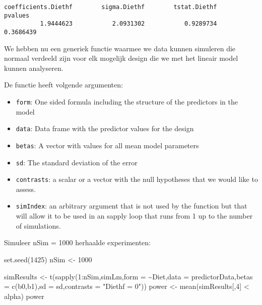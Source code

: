 \documentclass[
]{article}
\newenvironment{Shaded}{\begin{snugshade}}{\end{snugshade}}
\newcommand{\AttributeTok}[1]{\textcolor[rgb]{0.77,0.63,0.00}{#1}}
\newcommand{\DecValTok}[1]{\textcolor[rgb]{0.00,0.00,0.81}{#1}}
\newcommand{\FunctionTok}[1]{\textcolor[rgb]{0.00,0.00,0.00}{#1}}
\newcommand{\NormalTok}[1]{#1}
\newcommand{\OtherTok}[1]{\textcolor[rgb]{0.56,0.35,0.01}{#1}}
\newcommand{\SpecialCharTok}[1]{\textcolor[rgb]{0.00,0.00,0.00}{#1}}
\newcommand{\StringTok}[1]{\textcolor[rgb]{0.31,0.60,0.02}{#1}}
\providecommand{\tightlist}{%
  \setlength{\itemsep}{0pt}\setlength{\parskip}{0pt}}
\begin{document}
\begin{verbatim}
coefficients.Diethf        sigma.Diethf        tstat.Diethf             pvalues 
          1.9444623           2.0931302           0.9289734           0.3686439 
\end{verbatim}

We hebben nu een generiek functie waarmee we data kunnen simuleren die
normaal verdeeld zijn voor elk mogelijk design die we met het lineair
model kunnen analyseren.

De functie heeft volgende argumenten:

\begin{itemize}
\tightlist
\item
  \texttt{form}: One sided formula including the structure of the
  predictors in the model
\item
  \texttt{data}: Data frame with the predictor values for the design
\item
  \texttt{betas}: A vector with values for all mean model parameters
\item
  \texttt{sd}: The standard deviation of the error
\item
  \texttt{contrasts}: a scalar or a vector with the null hypotheses that
  we would like to assess.
\item
  \texttt{simIndex}: an arbitrary argument that is not used by the
  function but that will allow it to be used in an sapply loop that runs
  from 1 up to the number of simulations.
\end{itemize}

Simuleer nSim = 1000 herhaalde experimenten:

\begin{Shaded}
\begin{Highlighting}[]
\FunctionTok{set.seed}\NormalTok{(}\DecValTok{1425}\NormalTok{)}
\NormalTok{nSim }\OtherTok{\textless{}{-}} \DecValTok{1000}

\NormalTok{simResults  }\OtherTok{\textless{}{-}} \FunctionTok{t}\NormalTok{(}\FunctionTok{sapply}\NormalTok{(}\DecValTok{1}\SpecialCharTok{:}\NormalTok{nSim,simLm,}\AttributeTok{form =} \SpecialCharTok{\textasciitilde{}}\NormalTok{Diet,}\AttributeTok{data =}\NormalTok{ predictorData,}\AttributeTok{betas =} \FunctionTok{c}\NormalTok{(b0,b1),}\AttributeTok{sd =}\NormalTok{ sd,}\AttributeTok{contrasts =} \StringTok{"Diethf = 0"}\NormalTok{))}
\NormalTok{power }\OtherTok{\textless{}{-}} \FunctionTok{mean}\NormalTok{(simResults[,}\DecValTok{4}\NormalTok{] }\SpecialCharTok{\textless{}}\NormalTok{ alpha)}
\NormalTok{power}
\end{Highlighting}
\end{Shaded}
\end{document}
